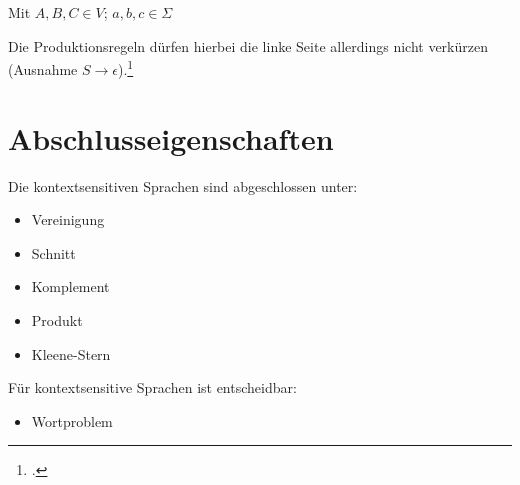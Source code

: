 \documentclass{lehramt-informatik-haupt}
\begin{document}
Mit $A,B,C \in V$; $a,b,c \in \Sigma$



Die Produktionsregeln dürfen hierbei die linke Seite allerdings nicht
verkürzen (Ausnahme $S \rightarrow \epsilon$).\footcite{theo:fs:3}

%

\section{Abschlusseigenschaften}

Die kontextsensitiven Sprachen sind abgeschlossen unter:

\begin{itemize}
\item Vereinigung
\item Schnitt
\item Komplement
\item Produkt
\item Kleene-Stern
\end{itemize}

Für kontextsensitive Sprachen ist entscheidbar:

\begin{itemize}
\item Wortproblem
\end{itemize}

\literatur
\end{document}

